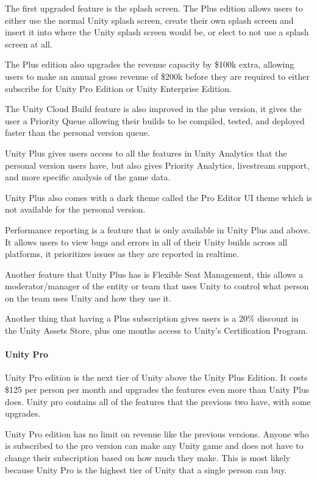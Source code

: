 \documentclass[12pt]{article}
\begin{document}
The first upgraded feature is the splash screen. The Plus edition allows
users to either use the normal Unity splash screen, create their own
splash screen and insert it into where the Unity splash screen would be,
or elect to not use a splash screen at all.

The Plus edition also upgrades the revenue capacity by \$100k extra,
allowing users to make an annual gross revenue of \$200k before they are
required to either subscribe for Unity Pro Edition or Unity Enterprise
Edition.

The Unity Cloud Build feature is also improved in the plus version, it
gives the user a Priority Queue allowing their builds to be compiled,
tested, and deployed faster than the personal version queue.

Unity Plus gives users access to all the features in Unity Analytics
that the personal version users have, but also gives Priority Analytics,
livestream support, and more specific analysis of the game data.

Unity Plus also comes with a dark theme called the Pro Editor UI theme
which is not available for the personal version.

Performance reporting is a feature that is only available in Unity Plus
and above. It allows users to view bugs and errors in all of their Unity
builds across all platforms, it prioritizes issues as they are reported
in realtime.

Another feature that Unity Plus has is Flexible Seat Management, this
allows a moderator/manager of the entity or team that uses Unity to
control what person on the team uses Unity and how they use it.

Another thing that having a Plus subscription gives users is a 20\%
discount in the Unity Assets Store, plus one months access to Unity's
Certification Program. \autocite{unityTable}

\paragraph{Unity Pro}\label{unity-pro}

Unity Pro edition is the next tier of Unity above the Unity Plus
Edition. It costs \$125 per person per month and upgrades the features
even more than Unity Plus does. Unity pro contains all of the features
that the previous two have, with some upgrades.

Unity Pro edition has no limit on revenue like the previous versions.
Anyone who is subscribed to the pro version can make any Unity game and
does not have to change their subscription based on how much they make.
This is most likely because Unity Pro is the highest tier of Unity that
a single person can buy.
\end{document}
